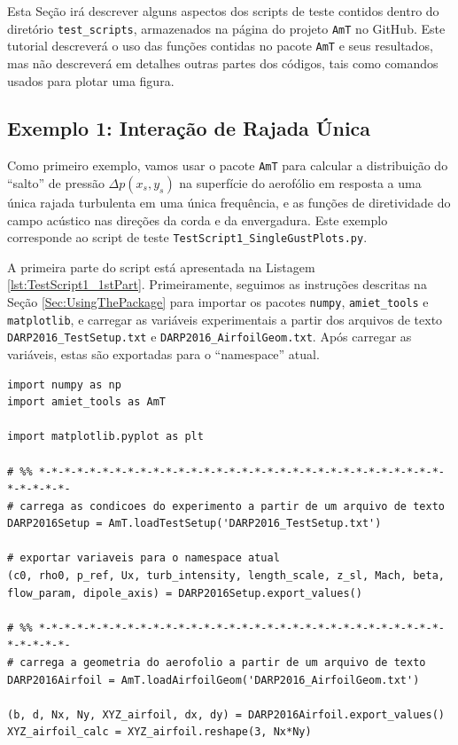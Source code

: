 \documentclass[a4paper, 11pt, twoside]{article}
\newcommand{\AmT}{\texttt{AmT}}
\begin{document}
Esta Seção irá descrever alguns aspectos dos scripts de teste contidos dentro do diretório \verb|test_scripts|, armazenados na página do projeto \AmT{} no GitHub. Este tutorial descreverá o uso das funções contidas no pacote \AmT{} e seus resultados, mas não descreverá em detalhes outras partes dos códigos, tais como comandos usados para plotar uma figura.

\subsection{Exemplo 1: Interação de Rajada Única}
\label{sec:SingleGustInteraction}

Como primeiro exemplo, vamos usar o pacote \AmT{} para calcular a distribuição do ``salto'' de pressão $\Delta p(x_s, y_s)$ na superfície do aerofólio em resposta a uma única rajada turbulenta em uma única frequência, e as funções de diretividade do campo acústico nas direções da corda e da envergadura. Este exemplo corresponde ao script de teste \verb|TestScript1_SingleGustPlots.py|.

A primeira parte do script está apresentada na Listagem \ref{lst:TestScript1_1stPart}. Primeiramente, seguimos as instruções descritas na Seção \ref{Sec:UsingThePackage} para importar os pacotes \verb|numpy|, \verb|amiet_tools| e \verb|matplotlib|, e carregar as variáveis experimentais a partir dos arquivos de texto \verb|DARP2016_TestSetup.txt| e \verb|DARP2016_AirfoilGeom.txt|. Após carregar as variáveis, estas são exportadas para o ``namespace'' atual. 

\begin{lstlisting}[caption={Script de teste 1 - início},label={lst:TestScript1_1stPart}]
import numpy as np
import amiet_tools as AmT

import matplotlib.pyplot as plt

# %% *-*-*-*-*-*-*-*-*-*-*-*-*-*-*-*-*-*-*-*-*-*-*-*-*-*-*-*-*-*-*-*-*-*-*-*-*-
# carrega as condicoes do experimento a partir de um arquivo de texto
DARP2016Setup = AmT.loadTestSetup('DARP2016_TestSetup.txt')

# exportar variaveis para o namespace atual
(c0, rho0, p_ref, Ux, turb_intensity, length_scale, z_sl, Mach, beta,
flow_param, dipole_axis) = DARP2016Setup.export_values()

# %% *-*-*-*-*-*-*-*-*-*-*-*-*-*-*-*-*-*-*-*-*-*-*-*-*-*-*-*-*-*-*-*-*-*-*-*-*-
# carrega a geometria do aerofolio a partir de um arquivo de texto
DARP2016Airfoil = AmT.loadAirfoilGeom('DARP2016_AirfoilGeom.txt')

(b, d, Nx, Ny, XYZ_airfoil, dx, dy) = DARP2016Airfoil.export_values()
XYZ_airfoil_calc = XYZ_airfoil.reshape(3, Nx*Ny)
\end{lstlisting}
\end{document}
